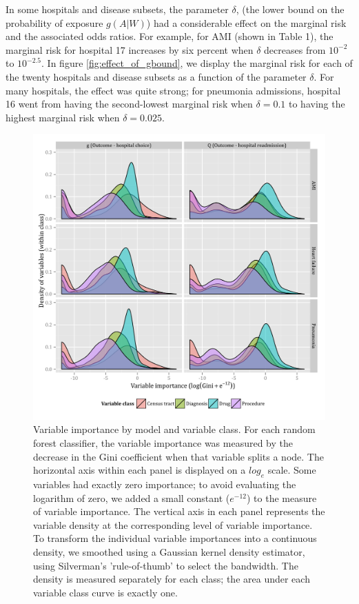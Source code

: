 \documentclass[]{article}\usepackage[]{graphicx}\usepackage[]{color}
\begin{document}
In some hospitals and disease subsets, the parameter $\delta$, (the lower bound on the probability of exposure $g(A|W)$) had a considerable effect on the marginal risk and the associated odds ratios. For example, for AMI (shown in Table 1), the marginal risk for hospital 17 increases by six percent when $\delta$ decreases from $10^{-2}$ to $10^{-2.5}$. In figure \ref{fig:effect_of_gbound}, we display the marginal risk for each of the twenty hospitals and disease subsets as a function of the parameter $\delta$. For many hospitals, the effect was quite strong; for pneumonia admissions, hospital 16 went from having the second-lowest marginal risk when $\delta=0.1$ to having the highest marginal risk when $\delta=0.025$. 


\begin{figure}[H]
    \includegraphics{../figures/variable_importance_by_model_and_class.png}
    \caption[Error rate for random forest model of hospital choice.]
{Variable importance by model and variable class. For each random forest classifier, the variable importance was measured by the decrease in the Gini coefficient when that variable splits a node. The horizontal axis within each panel is displayed on a $log_e$ scale. Some variables had exactly zero importance; to avoid evaluating the logarithm of zero, we added a small constant ($e^{-12}$) to the measure of variable importance. The vertical axis in each panel represents the variable density at the corresponding level of variable importance. To transform the individual variable importances into a continuous density, we smoothed using a Gaussian kernel density estimator, using Silverman's 'rule-of-thumb' \supercite{silverman_density_1986} to select the bandwidth. The density is measured separately for each class; the area under each variable class curve is exactly one.
}
   \label{fig:variable_importance_by_model_and_class}
\end{figure}
\end{document}
